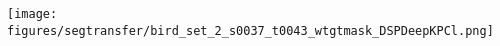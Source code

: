 \documentclass[10pt,twocolumn,letterpaper]{article}
\begin{document}
\begin{figure*}[t]
\begin{minipage}{0.538\linewidth}
\texttt{[image: figures/segtransfer/bird\_set\_2\_s0037\_t0043\_wtgtmask\_DSPDeepKPCl.png]}%
\end{minipage}
\end{figure*}
\end{document}

